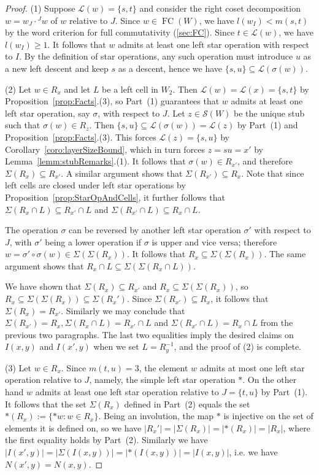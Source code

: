 \documentclass[ALCO,Unicode,published]{cedram}
\newcommand{\call}{\mathcal{L}}
\newcommand{\sw}{\mathcal{S}(W)}
\newcommand{\se}{\subseteq}
\newcommand{\inverse}{^{-1}}
\newcommand{\abs}[1]{\lvert #1 \rvert}
\DeclareMathOperator{\fc}{\mathrm{FC}}
\begin{document}
\begin{proof}
    (1)    Suppose $\call(w)=\{s,t\}$ and consider the right coset decomposition $w=w_J\cdot {}^J w$
    of $w$ relative to $J$. Since $w\in \fc(W)$, we have $l(w_I)<m(s,t)$ by the word criterion for
    full commutativity (\autoref{sec:FC}). Since $t\in \call(w)$, we have $l(w_I)\ge 1$.  It follows
    that $w$ admits at least one left star operation with respect to $I$. By the definition of star
    operations, any such operation must introduce $u$ as a new  left descent and keep $s$ as a
    descent, hence we have $\{s,u\}\se\call(\sigma(w))$.

    (2) Let $w\in R_x$ and let $L$ be a left cell in $W_2$.  Then $\call(w)= \call(x)=\{s,t\}$ by
    Proposition~\ref{prop:Facts}.(3), so Part~(1) guarantees that $w$ admits at least one left star operation,
    say $\sigma$, with respect to $J$. Let $z\in \sw$ be the unique stub such that $\sigma(w)\in
    R_z$. Then $\{s,u\}\se \call(\sigma(w))=\call(z)$ by Part~(1) and Proposition~\ref{prop:Facts}.(3). This
    forces $\call(z)=\{s,u\}$ by Corollary~\ref{coro:layerSizeBound}, which in turn forces $z=su=x'$ by
    Lemma~\ref{lemm:stubRemarks}.(1). It follows that $\sigma(w)\in R_{x'}$, and therefore
    $\Sigma(R_{x})\se R_{x'}$. A similar argument shows that $\Sigma(R_{x'})\se R_x$. Note that
    since left cells are closed under left star operations by Proposition~\ref{prop:StarOpAndCells}, it further
    follows that $\Sigma(R_x\cap L)\se R_{x'}\cap L$ and $\Sigma(R_{x'}\cap L)\se R_x\cap L$.


The operation $\sigma$ can be reversed by another left star operation $\sigma'$ with respect to $J$,
with $\sigma'$ being a lower operation if $\sigma$ is upper and vice versa; therefore
$w=\sigma'\circ\sigma(w)\in \Sigma(\Sigma(R_{x}))$.  It follows that $R_x\se \Sigma(\Sigma(R_x))$.
The same argument shows that $R_x\cap L\se \Sigma(\Sigma(R_{x}\cap L))$.


We have shown that  $\Sigma(R_x)\se R_{x'}$ and $R_x\se \Sigma(\Sigma(R_{x}))$, so $R_{x}\se
\Sigma(\Sigma(R_{x}))\se \Sigma(R_x')$.  Since $\Sigma(R_{x'})\se R_x$, it follows that
$\Sigma(R_x)=R_{x'}$.  Similarly we may conclude that $\Sigma(R_{x'})=R_x, \Sigma(R_x\cap
L)=R_{x'}\cap L$ and $\Sigma(R_{x'}\cap L)=R_x\cap L$ from the previous two paragraphs. The last two
equalities imply the desired claims on $I(x,y)$ and $I(x',y)$ when we set $L=R_y\inverse$, and the
proof of (2) is complete.

(3) Let $w\in R_x$. Since $m(t,u)=3$, the element $w$ admits at most one left star operation
relative to $J$, namely, the simple left star operation $*$. On the other hand $w$ admits at least
one left star operation relative to $J=\{t,u\}$ by Part~(1).  It follows that the set $\Sigma(R_x)$
defined in Part~(2) equals the set $*(R_x):=\{*w:w\in R_x\}$.  Being an involution, the map $*$ is
injective on the set of elements it is defined on, so we have
$\abs{R_x'}=\abs{\Sigma(R_x)}=\abs{*(R_x)}=\abs{R_x}$, where the first equality holds by Part~(2).
Similarly we have $\abs{I(x',y)}=\abs{\Sigma(I(x,y))}=\abs{*(I(x,y))}=\abs{I(x,y)}$, i.e. we have
$N(x',y)=N(x,y)$.
\end{proof}
\end{document}
